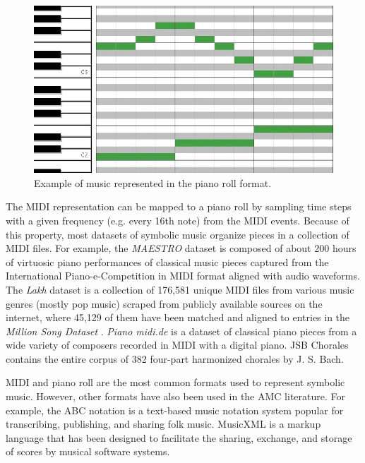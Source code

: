 \begin{figure}[!h]
 \centering
 \includegraphics[width=\columnwidth]{imgs/background/piano_roll.jpg}
 \caption{Example of music represented in the piano roll format.}
 \label{fig:piano_roll}
\end{figure}


The MIDI representation can be mapped to a piano roll by sampling time steps with a given frequency (e.g. every 16th note) from the MIDI events. Because of this property, most datasets of symbolic music organize pieces in a collection of MIDI files. For example, the \textit{MAESTRO} dataset \cite{hawthorne2018enabling} is composed of about 200 hours of virtuosic piano performances of classical music pieces captured from the International Piano-e-Competition \cite{yamahaEPiano} in MIDI format aligned with audio waveforms. The \textit{Lakh} \cite{raffel2016learning} dataset is a collection of 176,581 unique MIDI files from various music genres (mostly pop music) scraped from publicly available sources on the internet, where 45,129 of them have been matched and aligned to entries in the \textit{Million Song Dataset} \cite{bertin2011million}. \textit{Piano midi.de} is a dataset of classical piano pieces from a wide variety of composers recorded in MIDI with a digital piano. JSB Chorales \cite{boulanger2012modeling} contains the entire corpus of 382 four-part harmonized chorales by J. S. Bach.

MIDI and piano roll are the most common formats used to represent symbolic music. However, other formats have also been used in the AMC literature. For example, the ABC notation \cite{walshaw1993abc2mtex} is a text-based music notation system popular for transcribing, publishing, and sharing folk music. MusicXML \cite{good2001musicxml} is a markup language that has been designed to facilitate the sharing, exchange, and storage of scores by musical software systems.

